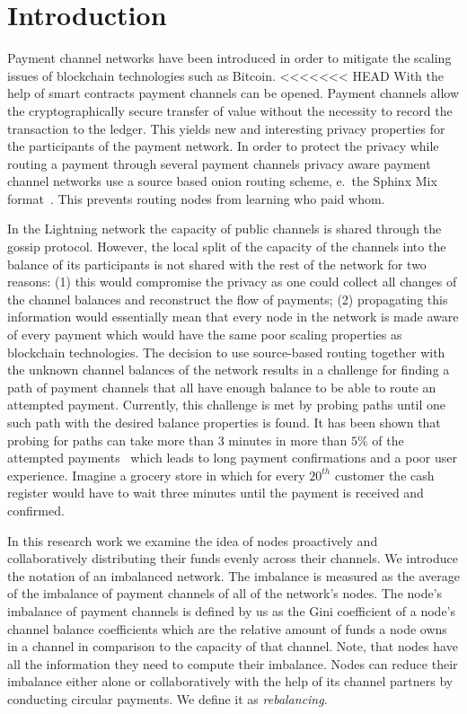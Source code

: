 \documentclass[a4paper]{paper}
\begin{document}
\section{Introduction}
Payment channel networks have been introduced in order to mitigate the scaling issues of blockchain technologies such as Bitcoin\cite{poon2016bitcoin}.
<<<<<<< HEAD
With the help of smart contracts payment channels can be opened. 
Payment channels allow the cryptographically secure transfer of value without the necessity to record the transaction to the ledger.
This yields new and interesting privacy properties for the participants of the payment network.
In order to protect the privacy while routing a payment through several payment channels privacy aware payment channel networks use a source based onion routing scheme, e.~the Sphinx Mix format~\cite{danezis2009sphinx}.
This prevents routing nodes from learning who paid whom.

In the Lightning network the capacity of public channels is shared through the gossip protocol. 
However, the local split of the capacity of the channels into the balance of its participants is not shared with the rest of the network for two reasons: 
(1) this would compromise the privacy as one could collect all changes of the channel balances and reconstruct the flow of payments;
(2) propagating this information would essentially mean that every node in the network is made aware of every payment which would have the same poor scaling properties as blockchain technologies.
The decision to use source-based routing together with the unknown channel balances of the network results in a challenge for finding a path of payment channels that all have enough balance to be able to route an attempted payment.
Currently, this challenge is met by probing paths until one such path with the desired balance properties is found.
It has been shown that probing for paths can take more than 3 minutes in more than $5\%$ of the attempted payments~\cite{decker2019lnconf} which leads to long payment confirmations and a poor user experience.
Imagine a grocery store in which for every $20^{th}$ customer the cash register would have to wait three minutes until the payment is received and confirmed.

In this research work we examine the idea of nodes proactively and collaboratively distributing their funds evenly across their channels.
We introduce the notation of an imbalanced network.
The imbalance is measured as the average of the imbalance of payment channels of all of the network's nodes.
The node's imbalance of payment channels is defined by us as the Gini coefficient of a node's channel balance coefficients which are the relative amount of funds a node owns in a channel in comparison to the capacity of that channel.
Note, that nodes have all the information they need to compute their imbalance. 
Nodes can reduce their imbalance either alone or collaboratively with the help of its channel partners by conducting circular payments. We define it as {\em rebalancing}.
\end{document}
